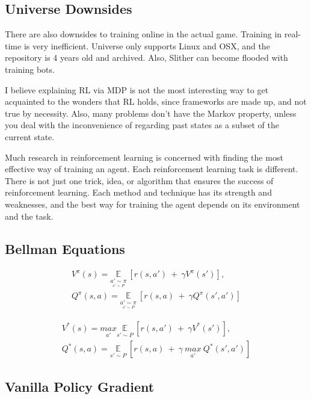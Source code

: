 \subsection{Universe Downsides}
There are also downsides to training online in the actual game. Training in real-time is very inefficient. Universe only supports Linux and OSX, and the repository is 4 years old and archived. Also, Slither can become flooded with training bots.

 I believe explaining RL via MDP is not the most interesting way to get acquainted to the wonders that RL holds, since frameworks are made up, and not true by necessity. Also, many problems don't have the Markov property, unless you deal with the inconvenience of regarding past states as a subset of the current state. 
 
 Much research in reinforcement learning is concerned with finding the most effective way of training an agent. Each reinforcement learning task is different. There is not just one trick, idea, or algorithm that ensures the success of reinforcement learning. Each method and technique has its strength and weaknesses, and the best way for training the agent depends on its environment and the task.
 
 
 
 \subsection{Bellman Equations}
 
 \begin{gather}
    V^\pi(s) =  \underset{\underset{s' \sim P}{a' \sim \pi }}{\mathbb{E}} \ [r(s,a')\ +\ \gamma V^\pi(s')], \\ 
    Q^\pi(s,a) =  \underset{\underset{s' \sim P}{a' \sim \pi }}{\mathbb{E}} \ [r(s,a)\ +\ \gamma Q^\pi(s',a')]
\end{gather}

\begin{gather}
    V^*(s) = \underset{a'}{max} \underset{s' \sim P}{\mathbb{E}} \ [r(s,a')\ +\ \gamma V^*(s')], \\ 
    Q^*(s,a) =  \underset{s' \sim P}{\mathbb{E}} \ [r(s,a)\ +\ \gamma \ \underset{a'}{max} \ Q^*(s',a')]
\end{gather}
 
 
 \subsection{Vanilla Policy Gradient}

